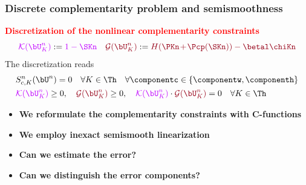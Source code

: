 %
\begin{frame}
\frametitle{Discrete complementarity problem and semismoothness}
\textcolor{red}{\textbf{Discretization of the nonlinear complementarity constraints}}
\begin{equation*}
\textcolor{electricpurple}{\mathcal{K}(\bU_K^n)} \egaldef \textcolor{electricpurple}{1-\SKn} \quad \textcolor{carmine} {\mathcal{G}(\bU_K^n)} \egaldef  \textcolor{carmine}{H(\PKn\hspace{-0.05 cm}+\hspace{-0.05 cm}\Pcp(\SKn))-\betal \chiKn}
\end{equation*}
\pause
The discretization reads
\begin{equation*}
\begin{split}
&S_{c,K}^n(\bU^n)=0 \quad \forall K \in \Th \quad \forall \componentc \in \left\{\componentw,\componenth \right\}\\
& \textcolor{electricpurple}{\mathcal{K}(\bU_K^n)} \geq 0, \quad   \textcolor{carmine} {\mathcal{G}(\bU_K^n)} \geq 0, \quad \textcolor{electricpurple}{\mathcal{K}(\bU_K^n)} \cdot \textcolor{carmine} {\mathcal{G}(\bU_K^n)}=0 \quad \forall K \in \Th
\end{split}
\end{equation*}
\pause
\begin{itemize}
\item
\textcolor{cadmiumgreen}{\textbf{We reformulate the complementarity constraints with C-functions}}
\item
\textcolor{cadmiumgreen}{\textbf{We employ inexact semismooth linearization}}
\item
\textcolor{cadmiumgreen}{\textbf{Can we estimate the error?}}
\item
\textcolor{cadmiumgreen}{\textbf{Can we distinguish the error components?}}
\end{itemize}
\end{frame} 
%
